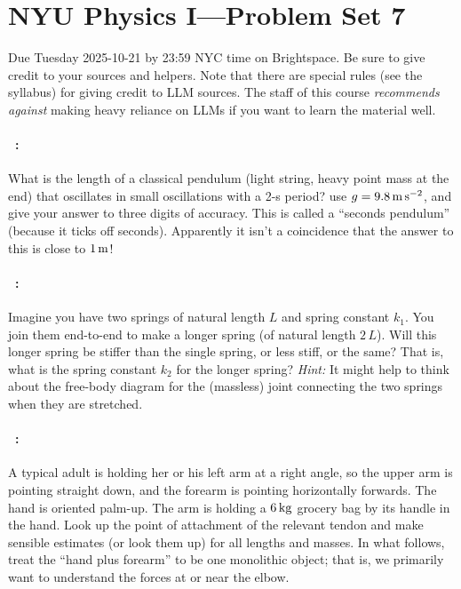 \documentclass[12pt]{article}
\begin{document}
\section*{NYU Physics I---Problem Set 7}

Due Tuesday 2025-10-21 by 23:59 NYC time on Brightspace.
Be sure to give credit to your sources and helpers.
Note that there are special rules (see the syllabus) for giving credit to LLM sources.
The staff of this course \emph{recommends against} making heavy reliance on LLMs if you want to learn the material well.

\paragraph{\problemname~\theproblem:}%
What is the length of a classical pendulum (light string, heavy point
mass at the end) that oscillates in small oscillations with a
2-s period? use $g=9.8\,\mathrm{m}\,\mathrm{s}^{-2}$, and give your answer to three digits of
accuracy. This is called a ``seconds pendulum'' (because it ticks off
seconds). Apparently it isn't a coincidence that the answer to this is
close to $1\,\mathrm{m}$!

\paragraph{\problemname~\theproblem:}%
Imagine you have two springs of natural length $L$ and spring constant $k_1$.
You join them end-to-end to make a longer spring (of natural length $2\,L$).
Will this longer spring be stiffer than the single spring, or less stiff, or the same?
That is, what is the spring constant $k_2$ for the longer spring?
\textsl{Hint:} It might help to think about the free-body diagram for the (massless) joint connecting the two springs when they are stretched.

\paragraph{\problemname~\theproblem:}%
A typical adult is holding her or his left arm at a right angle, so the
upper arm is pointing straight down, and the forearm is pointing
horizontally forwards.  The hand is oriented palm-up.  The arm is holding a
$6\,\mathrm{kg}$ grocery bag by its handle in the hand.  Look up the
point of attachment of the relevant tendon and make sensible estimates
(or look them up) for all lengths and masses.  In what follows, treat
the ``hand plus forearm'' to be one monolithic object; that is, we
primarily want to understand the forces at or near the elbow.
\end{document}
